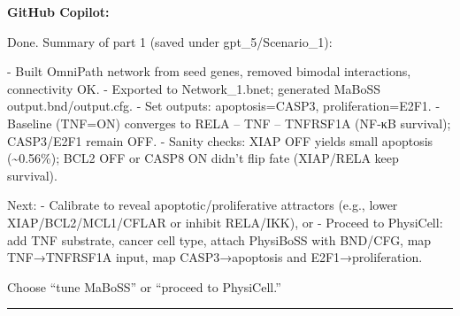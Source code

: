 \documentclass[11pt,a4paper]{article}
\begin{document}
\begin{copilotbox}
\textbf{GitHub Copilot:}

Done. Summary of part 1 (saved under gpt\_5/Scenario\_1):

- Built OmniPath network from seed genes, removed bimodal interactions, connectivity OK.
- Exported to Network\_1.bnet; generated MaBoSS output.bnd/output.cfg.
- Set outputs: apoptosis=CASP3, proliferation=E2F1.
- Baseline (TNF=ON) converges to RELA -- TNF -- TNFRSF1A (NF-κB survival); CASP3/E2F1 remain OFF.
- Sanity checks: XIAP OFF yields small apoptosis (\textasciitilde{}0.56\%); BCL2 OFF or CASP8 ON didn’t flip fate (XIAP/RELA keep survival).

Next:
- Calibrate to reveal apoptotic/proliferative attractors (e.g., lower XIAP/BCL2/MCL1/CFLAR or inhibit RELA/IKK), or
- Proceed to PhysiCell: add TNF substrate, cancer cell type, attach PhysiBoSS with BND/CFG, map TNF→TNFRSF1A input, map CASP3→apoptosis and E2F1→proliferation.

Choose “tune MaBoSS” or “proceed to PhysiCell.”

\end{copilotbox}
\bigskip\hrule\bigskip
\end{document}
